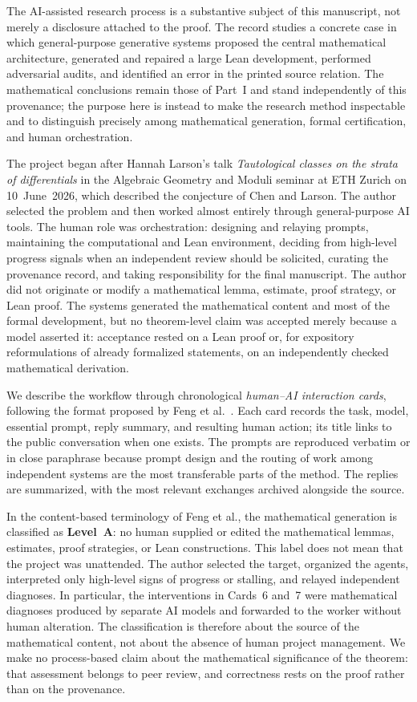 \documentclass[11pt]{article}
\theoremstyle{definition}
\theoremstyle{remark}
\begin{document}
The AI-assisted research process is a substantive subject of this manuscript,
not merely a disclosure attached to the proof.  The record studies a concrete
case in which general-purpose generative systems proposed the central
mathematical architecture, generated and repaired a large Lean development,
performed adversarial audits, and identified an error in the printed source
relation.  The mathematical conclusions remain those of Part~I and stand
independently of this provenance; the purpose here is instead to make the
research method inspectable and to distinguish precisely among mathematical
generation, formal certification, and human orchestration.

The project began after Hannah Larson's talk \emph{Tautological classes on the
strata of differentials} in the Algebraic Geometry and Moduli seminar at ETH
Zurich on 10~June~2026, which described the conjecture of Chen and Larson.  The
author selected the problem and then worked almost entirely through
general-purpose AI tools.  The human role was orchestration: designing and
relaying prompts, maintaining the computational and Lean environment, deciding
from high-level progress signals when an independent review should be
solicited, curating the provenance record, and taking responsibility for the
final manuscript.  The author did not originate or modify a mathematical
lemma, estimate, proof strategy, or Lean proof.  The systems generated the
mathematical content and most of the formal development, but no theorem-level
claim was accepted merely because a model asserted it: acceptance rested on a
Lean proof or, for expository reformulations of already formalized statements,
on an independently checked mathematical derivation.

We describe the workflow through chronological \emph{human--AI interaction
cards}, following the format proposed by Feng et al.~\cite{FengAletheia}.  Each
card records the task, model, essential prompt, reply summary, and resulting
human action; its title links to the public conversation when one exists.  The
prompts are reproduced verbatim or in close paraphrase because prompt design
and the routing of work among independent systems are the most transferable
parts of the method.  The replies are summarized, with the most relevant
exchanges archived alongside the source.

In the content-based terminology of Feng et al., the mathematical generation
is classified as \textbf{Level~A}: no human supplied or edited the mathematical
lemmas, estimates, proof strategies, or Lean constructions.  This label does
not mean that the project was unattended.  The author selected the target,
organized the agents, interpreted only high-level signs of progress or
stalling, and relayed independent diagnoses.  In particular, the interventions
in Cards~6 and~7 were mathematical diagnoses produced by separate AI models
and forwarded to the worker without human alteration.  The classification is
therefore about the source of the mathematical content, not about the absence
of human project management.  We make no process-based claim about the
mathematical significance of the theorem: that assessment belongs to peer
review, and correctness rests on the proof rather than on the provenance.
\end{document}

